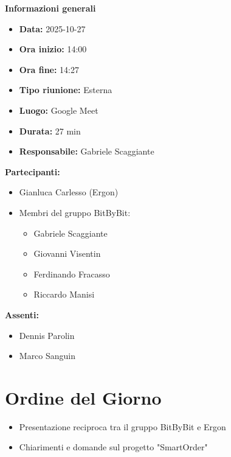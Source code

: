 \documentclass[a4paper,12pt]{article}
\begin{document}
\clearpage
{\large \textbf{Informazioni generali}}
{\footnotesize
{}

\begin{itemize}
    \item \textbf{Data:} 2025-10-27
    \item \textbf{Ora inizio:} 14:00
    \item \textbf{Ora fine:} 14:27
    \item \textbf{Tipo riunione:} Esterna
    \item \textbf{Luogo:} Google Meet
    \item \textbf{Durata:} 27 min
    \item \textbf{Responsabile:} Gabriele Scaggiante
\end{itemize}

\vspace{0.2cm}

\textbf{Partecipanti:}
\begin{itemize}
    \item Gianluca Carlesso (Ergon)
    \item Membri del gruppo BitByBit:
    \begin{itemize}
        \item Gabriele Scaggiante
        \item Giovanni Visentin
        \item Ferdinando Fracasso
        \item Riccardo Manisi
    \end{itemize}
\end{itemize}

\textbf{Assenti:}
\begin{itemize}
    \item Dennis Parolin
    \item Marco Sanguin
\end{itemize}
}

\vspace{0.5cm}

\vspace{0.8cm}

\clearpage
\tableofcontents
\thispagestyle{empty} %
\clearpage

\section{Ordine del Giorno}
\begin{itemize}
    \item Presentazione reciproca tra il gruppo BitByBit e Ergon
    \item Chiarimenti e domande sul progetto "SmartOrder"
\end{itemize}
\end{document}
